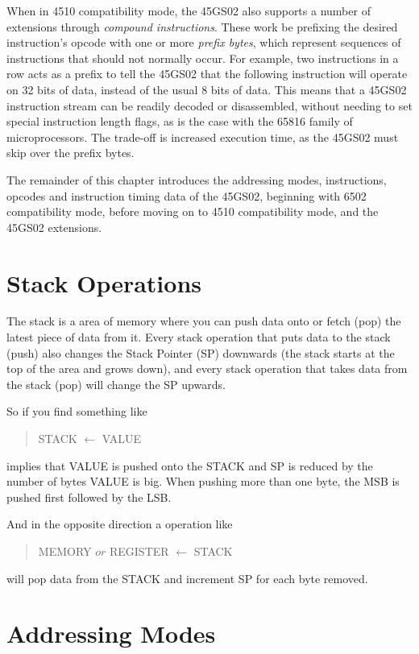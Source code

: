 When in 4510 compatibility mode, the 45GS02 also supports a number
of extensions through {\em compound instructions}. These work be prefixing
the desired instruction's opcode with one or more {\em prefix bytes}, which
represent sequences of instructions that should not normally occur.  For example,
two  instructions in a row acts as a prefix to tell the 45GS02 that the
following instruction will operate on 32 bits of data, instead of the usual 8 bits
of data.  This means that a 45GS02 instruction stream can be readily decoded or disassembled,
without needing to set special instruction length flags, as is the case with the 65816
family of microprocessors. The trade-off is increased execution time, as the 45GS02 must
skip over the prefix bytes.

The remainder of this chapter introduces the addressing modes, instructions, opcodes and
instruction timing data of the 45GS02, beginning with 6502 compatibility mode, before
moving on to 4510 compatibility mode, and the 45GS02 extensions.

\section{Stack Operations}

The stack is a area of memory where you can push data onto or fetch (pop) the latest piece
of data from it. Every stack operation that puts data to the stack (push) also changes the Stack
Pointer (SP) downwards (the stack starts at the top of the area and grows down), and every
stack operation that takes data from the stack (pop) will change the SP upwards.

So if you find something like
\begin{quote}
  STACK $\leftarrow$ VALUE
\end{quote}
implies that VALUE is pushed onto the STACK and SP is reduced by the number of bytes VALUE is
big. When pushing more than one byte, the MSB is pushed first followed by the LSB.

And in the opposite direction a operation like
\begin{quote}
  MEMORY $or$ REGISTER $\leftarrow$ STACK
\end{quote}
will pop data from the STACK and increment SP for each byte removed.

\section{Addressing Modes}
\label{sec:addressing-modes}

